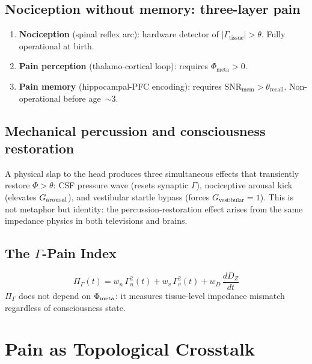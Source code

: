 \documentclass[aps,pre,twocolumn,superscriptaddress,floatfix]{revtex4-2}
\begin{document}
\subsection{Nociception without memory: three-layer pain}
\label{sec:infant-pain}

\begin{enumerate}
  \item \textbf{Nociception} (spinal reflex arc):
    hardware detector of $|\Gamma_{\text{tissue}}|>\theta$.
    Fully operational at birth.
  \item \textbf{Pain perception} (thalamo-cortical loop):
    requires $\Phi_{\text{meta}}>0$.
  \item \textbf{Pain memory} (hippocampal-PFC encoding):
    requires $\mathrm{SNR}_{\text{mem}}>\theta_{\text{recall}}$.
    Non-operational before age~$\sim$3.
\end{enumerate}

\subsection{Mechanical percussion and consciousness restoration}
\label{sec:percussion}

A physical slap to the head produces three simultaneous
effects that transiently restore $\Phi>\theta$:
CSF pressure wave (resets synaptic $\Gamma$),
nociceptive arousal kick (elevates $G_{\text{arousal}}$),
and vestibular startle bypass (forces $G_{\text{vestibular}}=1$).
This is not metaphor but identity: the percussion-restoration
effect arises from the same impedance physics in both
televisions and brains.

\subsection{The $\Gamma$-Pain Index}
\label{sec:gamma-pain-index}

\begin{equation}
  \boxed{\;
  \Pi_{\Gamma}(t) =
    w_n\,\Gamma_n^2(t) + w_v\,\Gamma_v^2(t)
    + w_D\,\frac{dD_Z}{dt}\;
  }
  \label{eq:gamma-pain-index}
\end{equation}
$\Pi_{\Gamma}$ does not depend on $\Phi_{\text{meta}}$:
it measures tissue-level impedance mismatch regardless of
consciousness state.


\section{Pain as Topological Crosstalk}
\label{sec:topological-crosstalk}
\end{document}
